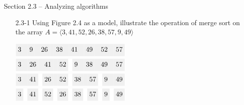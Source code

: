 \pagebreak

{\large Section 2.3 {--} Analyzing algorithms}

\begin{enumerate}

\item[2.3{-}1]{Using Figure 2.4 as a model, illustrate the operation of merge
sort on the array $A = \langle 3,41, 52, 26, 38, 57, 9, 49 \rangle$}

\begin{framed}

{\centering $ \displaystyle
\begin{aligned}
  \colorbox{gray!12}{\strut 3} \colorbox{gray!12}{\strut} \colorbox{gray!12}{\strut 9} \colorbox{gray!12}{\strut}
  \colorbox{gray!12}{\strut26} \colorbox{gray!12}{\strut} \colorbox{gray!12}{\strut38} \colorbox{gray!12}{\strut}
  \colorbox{gray!12}{\strut41} \colorbox{gray!12}{\strut} \colorbox{gray!12}{\strut49} \colorbox{gray!12}{\strut}
  \colorbox{gray!12}{\strut52} \colorbox{gray!12}{\strut} \colorbox{gray!12}{\strut57}\\
%
  \colorbox{gray!12}{\strut 3} \colorbox{gray!12}{\strut} \colorbox{gray!12}{\strut26} \colorbox{gray!12}{\strut}
  \colorbox{gray!12}{\strut41} \colorbox{gray!12}{\strut} \colorbox{gray!12}{\strut52} \colorbox{white}{\strut}
  \colorbox{gray!12}{\strut 9} \colorbox{gray!12}{\strut} \colorbox{gray!12}{\strut38} \colorbox{gray!12}{\strut}
  \colorbox{gray!12}{\strut49} \colorbox{gray!12}{\strut} \colorbox{gray!12}{\strut57}\\
%
  \colorbox{gray!12}{\strut 3} \colorbox{gray!12}{\strut} \colorbox{gray!12}{\strut41} \colorbox{white}{\strut}
  \colorbox{gray!12}{\strut26} \colorbox{gray!12}{\strut} \colorbox{gray!12}{\strut52} \colorbox{white}{\strut}
  \colorbox{gray!12}{\strut38} \colorbox{gray!12}{\strut} \colorbox{gray!12}{\strut57} \colorbox{white}{\strut}
  \colorbox{gray!12}{\strut 9} \colorbox{gray!12}{\strut} \colorbox{gray!12}{\strut49}\\
%
  \colorbox{gray!12}{\strut 3} \colorbox{white}{\strut}   \colorbox{gray!12}{\strut41} \colorbox{white}{\strut}
  \colorbox{gray!12}{\strut52} \colorbox{white}{\strut}   \colorbox{gray!12}{\strut26} \colorbox{white}{\strut}
  \colorbox{gray!12}{\strut38} \colorbox{white}{\strut}   \colorbox{gray!12}{\strut57} \colorbox{white}{\strut}
  \colorbox{gray!12}{\strut 9} \colorbox{white}{\strut}   \colorbox{gray!12}{\strut49}\\
\end{aligned} $ \par} %


\end{framed}
\end{enumerate}
